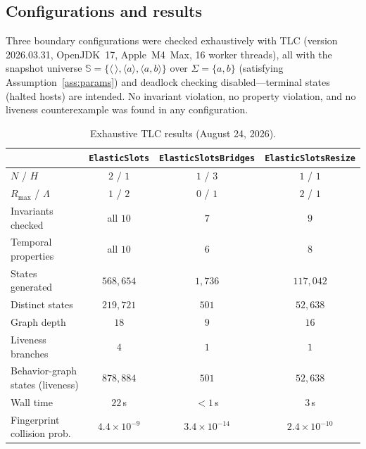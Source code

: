 \documentclass[11pt]{article}
\newcommand{\seq}[1]{\langle #1\rangle}
\newcommand{\emptyseq}{\seq{\,}}
\newcommand{\Snap}{\mathbb{S}}
\newcommand{\MaxLive}{\Lambda}
\newcommand{\MaxRes}{R_{\max}}
\newcommand{\tla}[1]{\texttt{#1}}
\theoremstyle{definition}
\theoremstyle{remark}
\begin{document}
\subsection{Configurations and results}

Three boundary configurations were checked exhaustively with TLC
(version 2026.03.31, OpenJDK~17, Apple~M4~Max, 16 worker threads), all with
the snapshot universe
$\Snap=\{\emptyseq,\seq{a},\seq{a,b}\}$ over $\Sigma=\{a,b\}$ (satisfying
Assumption~\ref{ass:params}) and deadlock checking disabled---terminal
states (halted hosts) are intended. No invariant violation, no property
violation, and no liveness counterexample was found in any configuration.

\begin{table}[htbp]
\centering\footnotesize
\begin{tabular}{@{}lccc@{}}
\toprule
 & \tla{ElasticSlots} & \tla{ElasticSlotsBridges}
 & \tla{ElasticSlotsResize} \\
\midrule
$N$ / $H$ & $2$ / $1$ & $1$ / $3$ & $1$ / $1$ \\
$\MaxRes$ / $\MaxLive$ & $1$ / $2$ & $0$ / $1$ & $2$ / $1$ \\
Invariants checked & all $10$ & $7$ & $9$ \\
Temporal properties & all $10$ & $6$ & $8$ \\
States generated & $568{,}654$ & $1{,}736$ & $117{,}042$ \\
Distinct states & $219{,}721$ & $501$ & $52{,}638$ \\
Graph depth & $18$ & $9$ & $16$ \\
Liveness branches & $4$ & $1$ & $1$ \\
Behavior-graph states (liveness) & $878{,}884$ & $501$ & $52{,}638$ \\
Wall time & $22$\,s & $<1$\,s & $3$\,s \\
Fingerprint collision prob.\ & $4.4\times 10^{-9}$
  & $3.4\times 10^{-14}$ & $2.4\times 10^{-10}$ \\
\bottomrule
\end{tabular}
\caption{Exhaustive TLC results (August 24, 2026).}
\label{tab:tlc}
\end{table}
\end{document}
